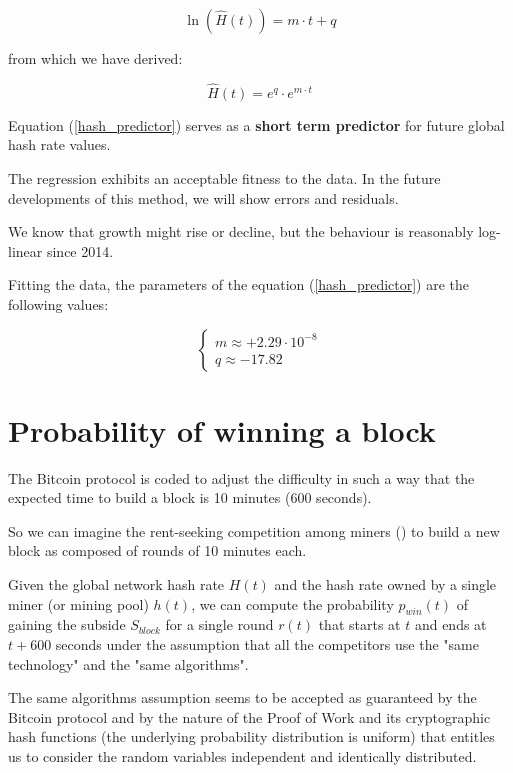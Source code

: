 \documentclass{article}
\begin{document}
\begin{equation}
    \ln(\widehat{H}(t)) = m \cdot t + q  \label{eq1}
\end{equation}

from which we have derived:

\begin{equation}
    \widehat{H}(t) = e^{q} \cdot e^{m \cdot t} \label{hash_predictor}
\end{equation}

Equation (\ref{hash_predictor}) serves as a \textbf{short term predictor} for future global hash rate values.

The regression exhibits an acceptable fitness to the data. In the future developments of this method, we will show errors and residuals.

We know that growth might rise or decline, but the behaviour is reasonably log-linear since 2014.

Fitting the data, the parameters of the equation (\ref{hash_predictor}) are the following values:

\begin{equation}
    \left \{
        \begin{array}{ll}
            m \approx +2.29 \cdot 10^{-8} \\
            q \approx -17.82
        \end{array}
    \right. \label{values}
\end{equation}

\section{Probability of winning a block}

The Bitcoin protocol is coded to adjust the difficulty in such a way that the expected time to build a block is 10 minutes (600 seconds).

So we can imagine the rent-seeking competition among miners (\cite{theEconomicLimits}) to build a new block as composed of rounds of 10 minutes each.

Given the global network hash rate $H(t)$ and the hash rate owned by a single miner (or mining pool) $h(t)$, we can compute the probability $p_{win}(t)$ of gaining the subside $S_{block}$ for a single round $r(t)$ that starts at $t$ and ends at $t+600$ seconds under the assumption that all the competitors use the "same technology" and the "same algorithms".

The same algorithms assumption seems to be accepted as guaranteed by the Bitcoin protocol and by the nature of the Proof of Work and its cryptographic hash functions (the underlying probability distribution is uniform) that entitles us to consider the random variables independent and identically distributed.
\end{document}
